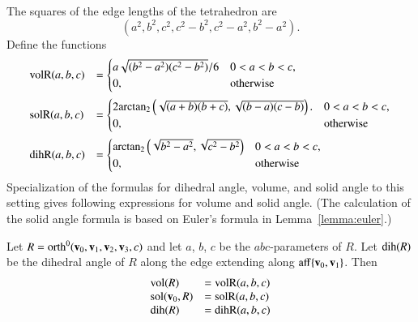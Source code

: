 The squares of the edge lengths of the tetrahedron are
\begin{displaymath}
(a^2,b^2,c^2,c^2-b^2,c^2-a^2,b^2-a^2).
\end{displaymath}
Define the functions
\begin{displaymath}
\begin{array}{lll}
\op{volR}(a,b,c) &= \begin{cases}
a\sqrt{(b^2-a^2)(c^2-b^2)}/6& 0 < a < b < c,\\
0,&\text{otherwise}
\end{cases}\vspace{6pt}\\
\op{solR}(a,b,c) &= \begin{cases}
2 \atn\left(\sqrt{{(a+b)(b+c)}},
\sqrt{{(b-a) (c-b)}}\right).& 0 < a < b < c,\\
0,&\text{otherwise}
\end{cases} \vspace{6pt}\\
\op{dihR}(a,b,c) &= \begin{cases}
\atn\left(\sqrt{b^2 - a^2},\sqrt{c^2 - b^2}\right)
& 0 < a < b < c,\\
0,&\text{otherwise}
\end{cases}
\end{array}
\end{displaymath}
%
%
%
Specialization of the formulas for dihedral angle, volume, and solid
angle to this setting gives following expressions for volume and solid
angle.  (The calculation of the solid angle formula is based on
Euler's formula in Lemma~\ref{lemma:euler}.)

\begin{lemma}\label{lemma:orth:abc} 
Let $R={\operatorname{orth}}^0({\mathbf v}_0,{\mathbf v}_1,{\mathbf v}_2,{\mathbf v}_3,c)$ and let $a$, $b$,
$c$ be the $abc$-parameters of $R$.  Let ${\operatorname{dih}}(R)$ be the dihedral
angle of $R$ along the edge extending along ${\operatorname{aff}}\{{\mathbf v}_0,{\mathbf v}_1\}$.  Then
\begin{displaymath}
\begin{array}{lll}
{\operatorname{vol}}(R) &= {\operatorname{volR}}(a,b,c)\\
{\operatorname{sol}}({\mathbf v}_0,R) &= {\operatorname{solR}}(a,b,c)\\
{\operatorname{dih}}(R) &= {\operatorname{dihR}}(a,b,c)\\
\end{array}
\end{displaymath}
\end{lemma}
%
%
%
%

